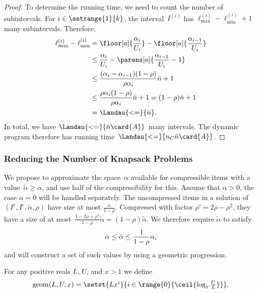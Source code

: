 \begin{proof}
  To determine the running time, we need to count the number of subintervals.
  For $i \in \setrange{1}{k}$,
  the interval~$I^{(i)}$ has $\ell^{(i)}_{\max} - \ell^{(i)}_{\min} + 1$ many subintervals.
  Therefore,
  \begin{equation}
    \begin{aligned}
      \ell^{(i)}_{\max} - \ell^{(i)}_{\min}
      &= \floor[a]{\frac{\alpha_i}{U_i}} - \floor[a]{\frac{\alpha_{i-1}}{U_i}} \\
       &\leq \frac{\alpha_i}{U_i} - \parens[a]{\frac{\alpha_{i-1}}{U_i} - 1} \\
       &\leq \frac{(\alpha_i - \alpha_{i-1}) (1 - \rho)}{\rho \alpha_i} \bar{n} + 1 \\
       &\leq \frac{\rho \alpha_i (1 - \rho)}{\rho \alpha_i} \bar{n} + 1
         = (1 - \rho) \bar{n} + 1 \\
       &= \Landau{<=}{\bar{n}} \dpunct{.}
    \end{aligned}
  \end{equation}
  In total, we have $\Landau{<=}{\bar{n} \card{A}}$~many intervals.
  The dynamic program therefore has running time~$\Landau{<=}{n_C \bar{n} \card{A}}$.
\end{proof}


\subsubsection{Reducing the Number of Knapsack Problems}
\label{sec:reducing-kp-problems}

We propose to approximate the space~$\alpha$ available for compressible items
with a value~$\tilde{\alpha} \geq \alpha$,
and use half of the compressibility for this.
Assume that $\alpha > 0$,
the case $\alpha = 0$ will be handled separately.
The uncompressed items in a solution of~$(I^c, I^c, \tilde{\alpha}, \rho)$
have size at most $\frac{\tilde{\alpha}}{1-\rho}$.
Compressed with factor $\rho' = 2\rho - \rho^2$,
they have a size of at most~$\frac{1-2\rho + \rho^2}{1-\rho} \tilde{\alpha} = (1-\rho) \tilde{\alpha}$.
We therefore require $\tilde{\alpha}$ to satisfy
\begin{equation}
  \label{eq:rounded-alpha}
  \alpha \leq \tilde{\alpha} \leq \frac{1}{1-\rho} \alpha \text{,}
\end{equation}
and will construct a set of such values by using a geometric progression.

\begin{definition}
  For any positive reals $L$, $U$, and $x > 1$
  we define
  \begin{equation}
    \textstyle \mathop{\mathrm{geom}}(L, U, x) = \setst{Lx^i}{i \in \range{0}{\ceil{\log_{x}\frac{U}{L}}}} \dpunct{.}
  \end{equation}
\end{definition}

